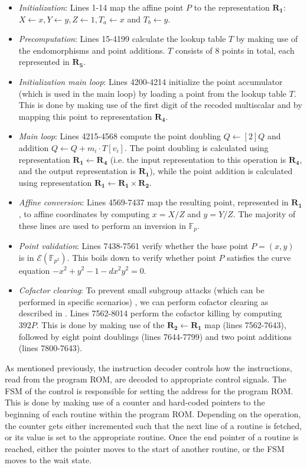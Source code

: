 \begin{itemize}
	\item \emph{Initialization}: Lines 1-14 map the affine point $P$ to the representation $\bm{R_1}$: $X \gets x, Y \gets y, Z \gets 1, T_a \gets x$ and $T_b \gets y$.

	\item \emph{Precomputation}: Lines 15-4199 calculate the lookup table $T$ by making use 
	of the endomorphisms and point additions. $T$ consists of 8 points in total, each represented in $\bm{R_5}$.
	
	\item \emph{Initialization main loop}: Lines 4200-4214 initialize the point accumulator (which is used in the main loop) by loading a point from the lookup table $T$. This is done by making use of the first digit of the recoded multiscalar and by mapping this point to representation $\bm{R_4}$. 
	
	\item \emph{Main loop}: Lines 4215-4568 compute the point doubling $Q \gets [2]Q$ and addition $Q \gets Q + m_i \cdot T[v_i]$. The point doubling is calculated using representation $\bm{R_1 \gets R_4}$ (i.e. the input representation to this operation is $\bm{R_4}$, and the output representation is $\bm{R_1}$), while the point addition is calculated using representation $\bm{R_1 \gets R_1 \times R_2}$.
	
	\item \emph{Affine conversion}: Lines 4569-7437 map the resulting point, represented in $\bm{R_1}$, to affine coordinates by computing $x = X/Z$ and $y = Y/Z$. The majority of these lines are used to perform an inversion in $\mathbb{F}_p$.
	
	\item \emph{Point validation}: Lines 7438-7561 verify whether the base point $P=(x, y)$ is in $\mathcal{E}(\mathbb{F}_{p^2})$. This boils down to verify whether point $P$ satisfies the curve equation $-x^2 + y^2 - 1 -dx^2y^2 = 0$.
	
	\item \emph{Cofactor clearing}: To prevent small subgroup attacks (which can be performed in specific scenarios) \cite{lim1997key}, we can perform cofactor clearing as described in \cite[Appendix A]{costello2015fourq}. Lines 7562-8014 perform the cofactor killing by computing $392P$. This is done by making use of the $\bm{R_2 \gets R_1}$ map (lines 7562-7643), followed by eight point doublings (lines 7644-7799) and two point additions (lines 7800-7643).
\end{itemize}
%
As mentioned previously, the instruction decoder controls how the instructions, read from the program ROM, are decoded to appropriate control signals.
The FSM of the control is responsible for setting the address for the program ROM. 
This is done by making use of a counter and hard-coded pointers to the beginning of each routine within the program ROM.
Depending on the operation, the counter gets either incremented such that the next line of a routine is fetched, or its value is set to the appropriate routine.
Once the end pointer of a routine is reached, either the pointer moves to the start of another routine, or the FSM moves to the wait state.

